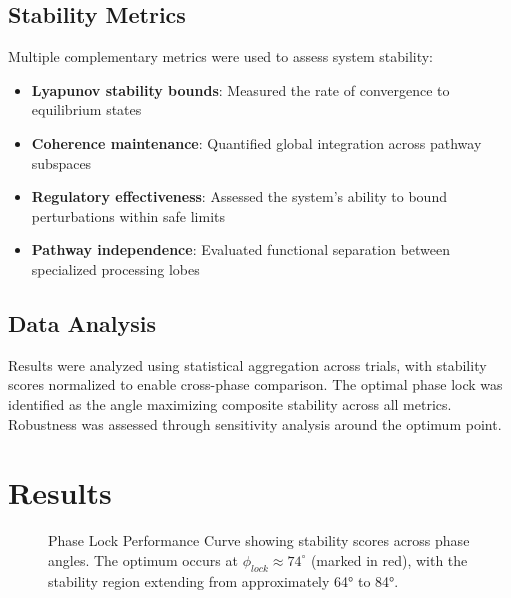 \documentclass[12pt,a4paper]{article}
\begin{document}
\subsection{Stability Metrics}

Multiple complementary metrics were used to assess system stability:

\begin{itemize}
\item \textbf{Lyapunov stability bounds}: Measured the rate of convergence to equilibrium states
\item \textbf{Coherence maintenance}: Quantified global integration across pathway subspaces  
\item \textbf{Regulatory effectiveness}: Assessed the system's ability to bound perturbations within safe limits
\item \textbf{Pathway independence}: Evaluated functional separation between specialized processing lobes
\end{itemize}

\subsection{Data Analysis}

Results were analyzed using statistical aggregation across trials, with stability scores normalized to enable cross-phase comparison. The optimal phase lock was identified as the angle maximizing composite stability across all metrics. Robustness was assessed through sensitivity analysis around the optimum point.

\section{Results}

\begin{figure}[H]
\centering
{}
\caption{Phase Lock Performance Curve showing stability scores across phase angles. The optimum occurs at $\phi_{lock} \approx 74^\circ$ (marked in red), with the stability region extending from approximately 64° to 84°.}
\label{fig:phase_lock_curve}
\end{figure}
\end{document}

